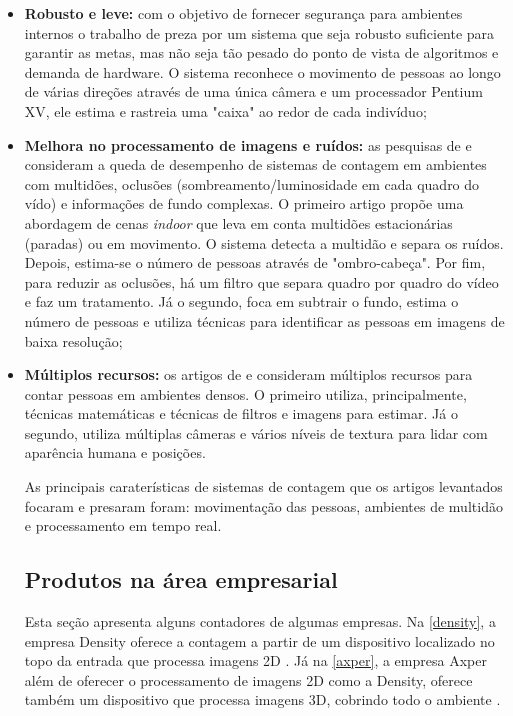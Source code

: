 \begin{itemize}
  \item \textbf{Robusto e leve:} com o objetivo de fornecer segurança para ambientes internos
  o trabalho de \cite{Kim2002} preza por um sistema que seja robusto suficiente para garantir as metas, mas
  não seja tão pesado do ponto de vista de algoritmos e demanda de hardware. O sistema reconhece o movimento de pessoas
  ao longo de várias direções através de uma única câmera e um processador Pentium XV, ele estima e rastreia uma "caixa" ao redor de cada indivíduo;
  \item \textbf{Melhora no processamento de imagens e ruídos:} as pesquisas de \cite{Lou2016} e \cite{Hou2011} consideram
  a queda de desempenho de sistemas de contagem em ambientes com multidões, oclusões (sombreamento/luminosidade
  em cada quadro do vído) e informações de fundo complexas. O primeiro artigo propõe uma abordagem de cenas \emph{indoor}
  que leva em conta multidões estacionárias (paradas) ou em movimento. O sistema detecta a multidão e separa
  os ruídos. Depois, estima-se o número de pessoas através de "ombro-cabeça". Por fim, para reduzir as oclusões,
  há um filtro que separa quadro por quadro do vídeo e faz um tratamento. Já o segundo, foca em subtrair o fundo, estima
  o número de pessoas e utiliza técnicas para identificar as pessoas em imagens de baixa resolução;
  \item \textbf{Múltiplos recursos:} os artigos de \cite{Venkatesh2015} e \cite{Ma2012} consideram múltiplos recursos para contar pessoas
  em ambientes densos. O primeiro utiliza, principalmente, técnicas matemáticas e técnicas de filtros e imagens para estimar. Já o segundo, utiliza
  múltiplas câmeras e vários níveis de textura para lidar com aparência humana e posições.

  As principais caraterísticas de sistemas de contagem que os artigos levantados focaram e presaram foram: movimentação das pessoas,
  ambientes de multidão e processamento em tempo real.

\subsection{Produtos na área empresarial}
Esta seção apresenta alguns contadores de algumas empresas. Na \autoref{density}, a empresa Density oferece a contagem a partir de um
dispositivo localizado no topo da entrada que processa imagens 2D \cite{Density2017}. Já na \autoref{axper}, a empresa Axper além de oferecer
o processamento de imagens 2D como a Density, oferece também um dispositivo que processa imagens 3D, cobrindo todo o ambiente \cite{Axper2017}.


\end{itemize}
